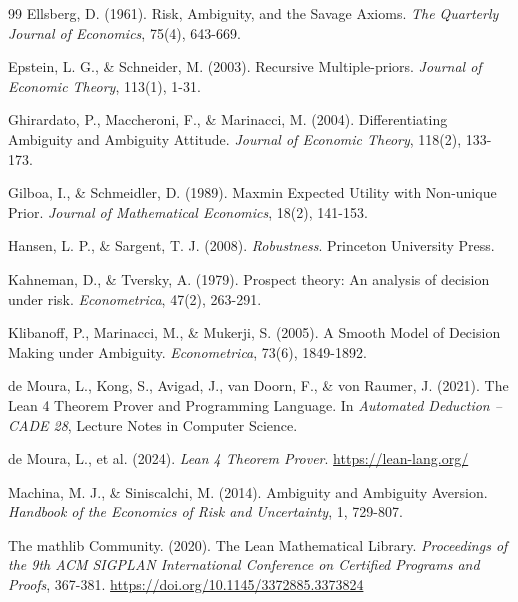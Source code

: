 \documentclass{article}
\theoremstyle{definition}
\begin{document}
\begin{thebibliography}{99}
 Ellsberg, D. (1961). Risk, Ambiguity, and the Savage Axioms. \textit{The Quarterly Journal of Economics}, 75(4), 643-669.



 Epstein, L. G., \& Schneider, M. (2003). Recursive Multiple-priors. \textit{Journal of Economic Theory}, 113(1), 1-31.


 Ghirardato, P., Maccheroni, F., \& Marinacci, M. (2004). Differentiating Ambiguity and Ambiguity Attitude. \textit{Journal of Economic Theory}, 118(2), 133-173.

 Gilboa, I., \& Schmeidler, D. (1989). Maxmin Expected Utility with Non-unique Prior. \textit{Journal of Mathematical Economics}, 18(2), 141-153.

 Hansen, L. P., \& Sargent, T. J. (2008). \textit{Robustness}. Princeton University Press.



 Kahneman, D., \& Tversky, A. (1979). Prospect theory: An analysis of decision under risk. \textit{Econometrica}, 47(2), 263-291.

 Klibanoff, P., Marinacci, M., \& Mukerji, S. (2005). A Smooth Model of Decision Making under Ambiguity. \textit{Econometrica}, 73(6), 1849-1892.

 de Moura, L., Kong, S., Avigad, J., van Doorn, F., \& von Raumer, J. (2021). The Lean 4 Theorem Prover and Programming Language. In \textit{Automated Deduction – CADE 28}, Lecture Notes in Computer Science.

 de Moura, L., et al. (2024). \textit{Lean 4 Theorem Prover}. \url{https://lean-lang.org/}

 Machina, M. J., \& Siniscalchi, M. (2014). Ambiguity and Ambiguity Aversion. \textit{Handbook of the Economics of Risk and Uncertainty}, 1, 729-807.

 The mathlib Community. (2020). The Lean Mathematical Library. \emph{Proceedings of the 9th ACM SIGPLAN International Conference on Certified Programs and Proofs}, 367-381. \url{https://doi.org/10.1145/3372885.3373824}


\end{thebibliography}
\end{document}
